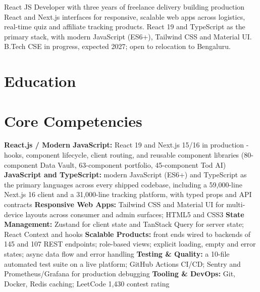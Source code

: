\documentclass[11pt,a4paper,sans]{moderncv}
\begin{document}
\makecvtitle


\vspace{4pt}
\small{React JS Developer with three years of freelance delivery building production React and Next.js interfaces for responsive, scalable web apps across logistics, real-time quiz and affiliate tracking products. React 19 and TypeScript as the primary stack, with modern JavaScript (ES6+), Tailwind CSS and Material UI. B.Tech CSE in progress, expected 2027; open to relocation to Bengaluru.}


\section{Education}
\vspace{1pt}


\section{Core Competencies}
\vspace{1pt}
\raggedright
\textbf{React.js / Modern JavaScript:} React 19 and Next.js 15/16 in production - hooks, component lifecycle, client routing, and reusable component libraries (80-component Data Vault, 63-component portfolio, 45-component Tod AI) \textbar{}
\textbf{JavaScript and TypeScript:} modern JavaScript (ES6+) and TypeScript as the primary languages across every shipped codebase, including a 59,000-line Next.js 16 client and a 31,000-line tracking platform, with typed props and API contracts \textbar{}
\textbf{Responsive Web Apps:} Tailwind CSS and Material UI for multi-device layouts across consumer and admin surfaces; HTML5 and CSS3 \textbar{}
\textbf{State Management:} Zustand for client state and TanStack Query for server state; React Context and hooks \textbar{}
\textbf{Scalable Products:} front ends wired to backends of 145 and 107 REST endpoints; role-based views; explicit loading, empty and error states; async data flow and error handling \textbar{}
\textbf{Testing \& Quality:} a 10-file automated test suite on a live platform; GitHub Actions CI/CD; Sentry and Prometheus/Grafana for production debugging \textbar{}
\textbf{Tooling \& DevOps:} Git, Docker, Redis caching; LeetCode 1,430 contest rating
\par\normalfont
\end{document}
